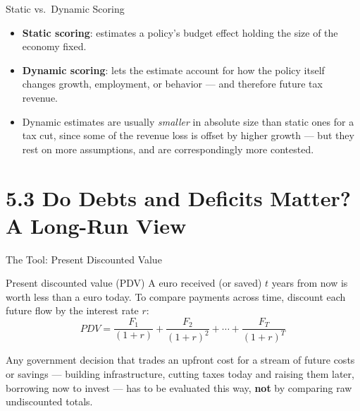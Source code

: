 \documentclass[11pt,aspectratio=169]{beamer}
\begin{document}
\begin{frame}{Static vs.\ Dynamic Scoring}
   
  \begin{itemize}
    \item \textbf{Static scoring}: estimates a policy's budget effect holding the size of the economy fixed.
    \item \textbf{Dynamic scoring}: lets the estimate account for how the policy itself changes growth, employment, or behavior --- and therefore future tax revenue.
    \item Dynamic estimates are usually \emph{smaller} in absolute size than static ones for a tax cut, since some of the revenue loss is offset by higher growth --- but they rest on more assumptions, and are correspondingly more contested.
  \end{itemize}
 
\end{frame}

\section{5.3 Do Debts and Deficits Matter? A Long-Run View}

\begin{frame}{The Tool: Present Discounted Value}
  \begin{block}{Present discounted value (PDV)}
    A euro received (or saved) $t$ years from now is worth less than a euro today. To compare payments across time, discount each future flow by the interest rate $r$:
    \[
      PDV = \frac{F_1}{(1+r)} + \frac{F_2}{(1+r)^2} + \cdots + \frac{F_T}{(1+r)^T}
    \]
  \end{block}
  \vspace{0.3em}
  Any government decision that trades an upfront cost for a stream of future costs or savings --- building infrastructure, cutting taxes today and raising them later, borrowing now to invest --- has to be evaluated this way, \textbf{not} by comparing raw undiscounted totals.
\end{frame}
\end{document}
